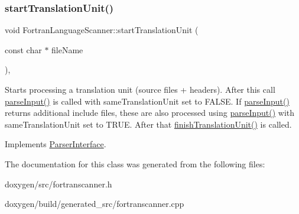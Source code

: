 \mbox{\label{class_fortran_language_scanner_a571f9440b581ce6fdc1b15c08427932d}} 
\subsubsection{\texorpdfstring{startTranslationUnit()}{startTranslationUnit()}}
{\footnotesize\ttfamily void Fortran\+Language\+Scanner\+::start\+Translation\+Unit (\begin{DoxyParamCaption}\item[{const char $\ast$}]{file\+Name }\end{DoxyParamCaption})\hspace{0.3cm}{\ttfamily [inline]}, {\ttfamily [virtual]}}

Starts processing a translation unit (source files + headers). After this call \mbox{\hyperlink{class_fortran_language_scanner_a6f2e7fa4a4d46ae48289cd135f9f495d}{parse\+Input()}} is called with same\+Translation\+Unit set to F\+A\+L\+SE. If \mbox{\hyperlink{class_fortran_language_scanner_a6f2e7fa4a4d46ae48289cd135f9f495d}{parse\+Input()}} returns additional include files, these are also processed using \mbox{\hyperlink{class_fortran_language_scanner_a6f2e7fa4a4d46ae48289cd135f9f495d}{parse\+Input()}} with same\+Translation\+Unit set to T\+R\+UE. After that \mbox{\hyperlink{class_fortran_language_scanner_abf5a872f1e3bd81f5a285e9586869def}{finish\+Translation\+Unit()}} is called. 

Implements \mbox{\hyperlink{class_parser_interface_a72478f87ead5fde10d7d6bbe32a73024}{Parser\+Interface}}.



The documentation for this class was generated from the following files\+:\begin{DoxyCompactItemize}
\item 
doxygen/src/fortranscanner.\+h\item 
doxygen/build/generated\+\_\+src/fortranscanner.\+cpp\end{DoxyCompactItemize}
